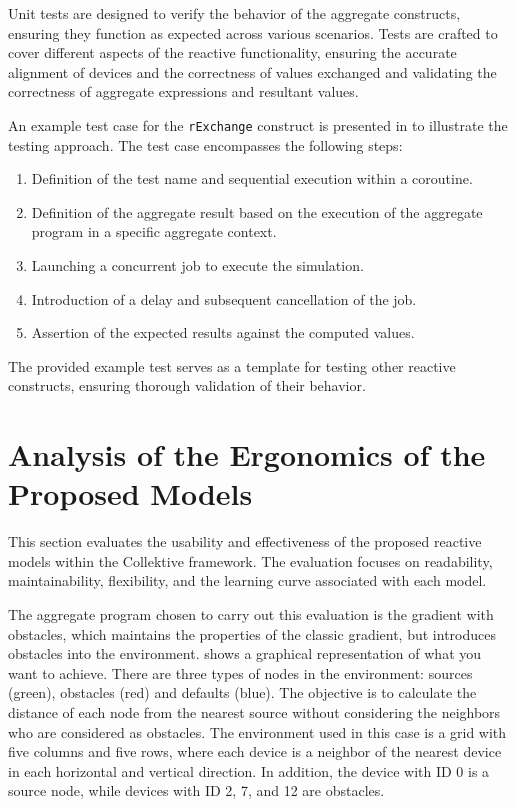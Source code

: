 Unit tests are designed to verify the behavior of the aggregate constructs, ensuring they function as expected across various scenarios. Tests are crafted to cover different aspects of the reactive functionality, ensuring the accurate alignment of devices and the correctness of values exchanged and validating the correctness of aggregate expressions and resultant values.

An example test case for the \texttt{rExchange} construct is presented in  to illustrate the testing approach. The test case encompasses the following steps:

\begin{enumerate}
    \item Definition of the test name and sequential execution within a coroutine.
    \item Definition of the aggregate result based on the execution of the aggregate program in a specific aggregate context.
    \item Launching a concurrent job to execute the simulation.
    \item Introduction of a delay and subsequent cancellation of the job.
    \item Assertion of the expected results against the computed values.
\end{enumerate}

The provided example test serves as a template for testing other reactive constructs, ensuring thorough validation of their behavior.



\section{Analysis of the Ergonomics of the Proposed Models}
\label{section:analysis-ergonomics-proposed-models}

This section evaluates the usability and effectiveness of the proposed reactive models within the Collektive framework. The evaluation focuses on readability, maintainability, flexibility, and the learning curve associated with each model.

The aggregate program chosen to carry out this evaluation is the gradient with obstacles, which maintains the properties of the classic gradient, but introduces obstacles into the environment.  shows a graphical representation of what you want to achieve. There are three types of nodes in the environment: sources (green), obstacles (red) and defaults (blue). The objective is to calculate the distance of each node from the nearest source without considering the neighbors who are considered as obstacles. The environment used in this case is a grid with five columns and five rows, where each device is a neighbor of the nearest device in each horizontal and vertical direction. In addition, the device with ID 0 is a source node, while devices with ID 2, 7, and 12 are obstacles.


